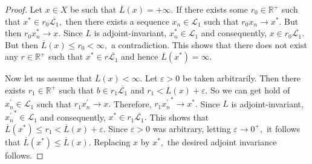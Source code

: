 \documentclass[a4paper,11pt,reqno]{amsart}
\theoremstyle{plain}
\newtheorem{lem}[thm]{Lemma}
\theoremstyle{mainthmstyle}
\theoremstyle{named}
\numberwithin{equation}{section}
\begin{document}
\begin{proof}
Let $x \in X$ be such that $\overline {L} (x) = +\infty.$ If there exists some $r_0 \in \mathbb R^{+}$ such that $x^{\ast} \in r_0 \overline {\mathcal {L}_1},$ then there exists a sequence $x_n \in \mathcal L_1$ such that $r_0 x_n \rightarrow x^{\ast}.$ But then $r_0 x_n^{\ast} \rightarrow x.$ Since $L$ is adjoint-invariant, $x_n^{\ast} \in \mathcal {L}_1$ and consequently, $x \in r_0 \overline {\mathcal {L}_1}.$ But then $\overline {L} (x) \leq r_0 < \infty,$ a contradiction. This shows that there does not exist any $r \in \mathbb R^{+}$ such that $x^{\ast} \in r \overline {\mathcal {L}_1}$ and hence $\overline {L} \left (x^{\ast} \right ) = \infty.$

Now let us assume that $\overline {L} (x) < \infty.$ Let $\varepsilon > 0$ be taken arbitrarily. Then there exists $r_1 \in \mathbb R^{+}$ such that $b \in r_1 \overline {\mathcal {L}_1}$ and $r_1 < \overline {L} (x) + \varepsilon.$ So we can get hold of $x_n^{\prime} \in \mathcal L_1$ such that $r_1 x_n^{\prime} \rightarrow x.$ Therefore, $r_1 {x_n^{\prime}}^{\ast} \rightarrow x^{\ast}.$ Since $L$ is adjoint-invariant, ${x_n^{\prime}}^{\ast} \in \mathcal {L}_1$ and consequently, $x^{\ast} \in r_1 \overline {\mathcal {L}_1}.$ This shows that $\overline {L} \left (x^{\ast} \right ) \leq r_1 < \overline {L} (x) + \varepsilon.$ Since $\varepsilon > 0$ was arbitrary, letting $\varepsilon \rightarrow 0^{+},$ it follows that $\overline {L} \left (x^{\ast} \right ) \leq \overline {L} (x).$ Replacing $x$ by $x^{\ast},$ the desired adjoint invariance follows.
\end{proof}


\end{document}

